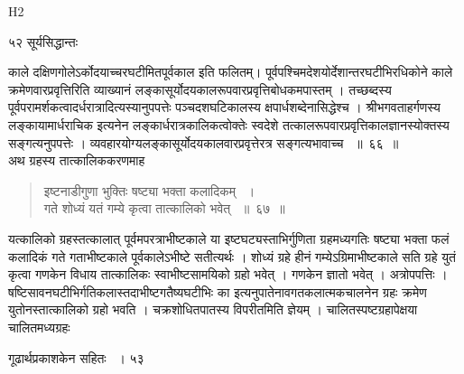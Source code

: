 \documentclass[11pt, openany]{book}
\begin{document}
{\tiny{H2}}

\newpage

\noindent ५२ \hspace{4cm} सूर्यसिद्धान्तः
\vspace{1cm}

\begin{sloppypar}
\noindent काले दक्षिणगोलेऽर्कोदयाच्चरघटीमितपूर्वकाल इति फलितम्। पूर्वपश्चिमदेशयोर्देशान्तरघटीभिरधिकोने काले क्रमेणवारप्रवृत्तिरिति व्याख्यानं लङ्कासूर्योदयकालरूपवारप्रवृत्तिबोधकमपास्तम् । तच्छब्दस्य पूर्वपरामर्शकत्वादर्धरात्रादित्यस्यानुपपत्तेः पञ्चदशघटिकालस्य क्षपार्धशब्देनासिद्धेश्च । श्रीभगवताहर्गणस्य लङ्कायामार्धराचिक इत्यनेन लङ्कार्धरात्रकालिकत्वोक्तेः स्वदेशे तत्कालरूपवारप्रवृत्तिकालज्ञानस्योक्तस्य सङ्गत्यनुपपत्तेः । व्यवहारयोग्यलङ्कासूर्योदयकालवारप्रवृत्तेरत्र सङ्गत्यभावाच्च ~॥~६६~॥\\ 
\noindent अथ ग्रहस्य तात्कालिककरणमाह\textendash
\end{sloppypar}
\begin{quote}

{\ssi इष्टनाडीगुणा भुक्तिः षष्ट्या भक्ता कलादिकम् ~।\\
गते शोध्यं यतं गम्ये कृत्वा तात्कालिको भवेत् ~॥~६७~॥}
\end{quote}
\begin{sloppypar}
यत्कालिको ग्रहस्तत्कालात् पूर्वमपरत्राभीष्टकाले या इष्टघट्यस्ताभिर्गुणिता ग्रहमध्यगतिः षष्ट्या भक्ता फलं कलादिकं गते गताभीष्टकाले पूर्वकालेऽभीष्टे सतीत्यर्थः । शोध्यं ग्रहे हीनं गम्येऽग्रिमाभीष्टकाले सति ग्रहे युतं कृत्वा गणकेन विधाय तात्कालिकः स्वाभीष्टसामयिको ग्रहो भवेत् । गणकेन ज्ञातो भवेत् । अत्रोपपत्तिः । षष्टिसावनघटीभिर्गतिकलास्तदाभीष्टगतैष्यघटीभिः का इत्यनुपातेनावगतकलात्मकचालनेन ग्रहः क्रमेण युतोनस्तात्कालिको ग्रहो भवति । चक्रशोधितपातस्य विपरीतमिति ज्ञेयम् । चालितस्पष्टग्रहापेक्षया चालितमध्यग्रहः
\end{sloppypar}

\newpage

\hspace{3cm}गूढार्थप्रकाशकेन सहितः ~। \hfill ५३
\vspace{1cm}
\end{document}
